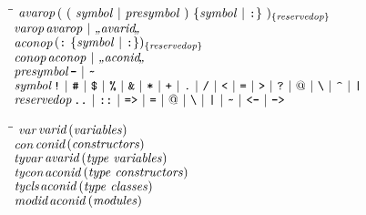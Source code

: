 \begin{flushleft}\it\begin{tabbing}
\hspace{0.5in}\=\hspace{3.0in}\=\kill
$\it avarop$\>\makebox[3.5em]{$\rightarrow$}$\it (\ (\ symbol\ |\ presymbol\ )\ \{symbol\ |\ \makebox{\tt :}\}\ )_{\{reservedop\}}$\\ 
$\it varop$\>\makebox[3.5em]{$\rightarrow$}$\it avarop\ |\ \bkqB{avarid}\bkqA$\\ 
$\it aconop$\>\makebox[3.5em]{$\rightarrow$}$\it (\makebox{\tt :}\ \{symbol\ |\ \makebox{\tt :}\})_{\{reservedop\}}$\\ 
$\it conop$\>\makebox[3.5em]{$\rightarrow$}$\it aconop\ |\ \bkqB{aconid}\bkqA$\\ 
$\it presymbol$\>\makebox[3.5em]{$\rightarrow$}$\it \makebox{\tt -}\ |\ \makebox{\tt {\char'176}}$\\ 
$\it symbol$\>\makebox[3.5em]{$\rightarrow$}$\it \makebox{\tt !}\ |\ \makebox{\tt {\char'43}}\ |\ \makebox{\tt {\char'44}}\ |\ \makebox{\tt {\char'45}}\ |\ \makebox{\tt {\char'46}}\ |\ \makebox{\tt *}\ |\ \makebox{\tt +}\ |\ \makebox{\tt .}\ |\ \makebox{\tt /}\ |\ \makebox{\tt <}\ |\ \makebox{\tt =}\ |\ \makebox{\tt >}\ |\ \makebox{\tt ?}\ |\ @\ |\ \makebox{\tt {\char'134}}\ |\ \makebox{\tt {\char'136}}\ |\ \makebox{\tt |}$\\ 
$\it reservedop$\>\makebox[3.5em]{$\rightarrow$}$\it \makebox{\tt ..}\ |\ \makebox{\tt ::}\ |\ \makebox{\tt =>}\ |\ \makebox{\tt =}\ |\ @\ |\ \makebox{\tt {\char'134}}\ |\ \makebox{\tt |}\ |\ \makebox{\tt {\char'176}}\ |\ \makebox{\tt <-}\ |\ \makebox{\tt ->}$
\end{tabbing}\end{flushleft}
%
%
%
%
%
%
%

\begin{flushleft}\it\begin{tabbing}
\hspace{0.5in}\=\hspace{3.0in}\=\kill
$\it var$\>\makebox[3.5em]{$\rightarrow$}$\it varid$\>\makebox[3em]{}$\it (variables)$\\ 
$\it con$\>\makebox[3.5em]{$\rightarrow$}$\it conid$\>\makebox[3em]{}$\it (constructors)$\\ 
$\it tyvar$\>\makebox[3.5em]{$\rightarrow$}$\it avarid$\>\makebox[3em]{}$\it (type\ variables)$\\ 
$\it tycon$\>\makebox[3.5em]{$\rightarrow$}$\it aconid$\>\makebox[3em]{}$\it (type\ constructors)$\\ 
$\it tycls$\>\makebox[3.5em]{$\rightarrow$}$\it aconid$\>\makebox[3em]{}$\it (type\ classes)$\\ 
$\it modid$\>\makebox[3.5em]{$\rightarrow$}$\it aconid$\>\makebox[3em]{}$\it (modules)$
\end{tabbing}\end{flushleft}
%
%
%
%
%
%

